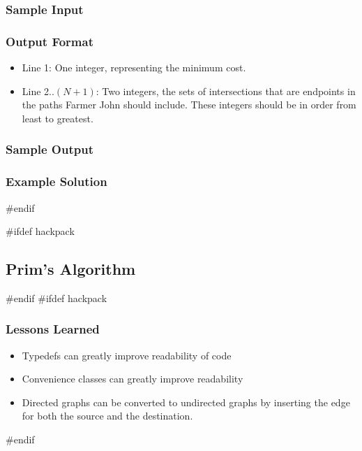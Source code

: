 \subsubsection{Sample Input}
\subsubsection{Output Format}
\begin{itemize}
	\item Line 1: One integer, representing the minimum cost.
	\item Line 2..$(N+1)$: Two integers, the sets of intersections that are endpoints in the paths Farmer John should include. These integers should be in order from least to greatest.
\end{itemize}
\subsubsection{Sample Output}
\subsubsection{Example Solution}
#endif

#ifdef hackpack
\subsection{Prim's Algorithm}
#endif
#ifdef hackpack
\subsubsection{Lessons Learned}
\begin{itemize}
	\item Typedefs can greatly improve readability of code
	\item Convenience classes can greatly improve readability
	\item Directed graphs can be converted to undirected graphs by inserting the edge for both the source and the destination.
\end{itemize}
#endif

